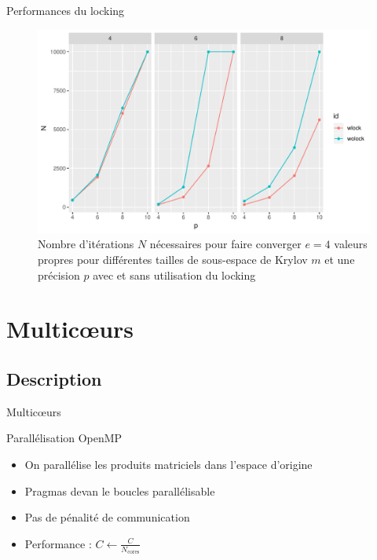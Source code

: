 \documentclass[9.5pt]{beamer}
\begin{document}
		\begin{frame}{Performances du locking}
			\begin{figure}
				\centering
				\includegraphics[width=0.8\linewidth, keepaspectratio]{../rapport/plots/Nvsp_complock.pdf}
				\caption{Nombre d'itérations $N$ nécessaires pour faire converger $e = 4$ valeurs propres pour différentes tailles de sous-espace de Krylov $m$ et une précision $p$ avec et sans utilisation du locking \label{fig:Nvsp_complock}}
			\end{figure}
		\end{frame}

\section{Multic\oe{}urs}
		\subsection{Description}
		\begin{frame}{Multic\oe{}urs}
			\begin{block}{Parallélisation OpenMP}
				\begin{itemize}
					\item On parallélise les produits matriciels dans l'espace d'origine
					\item Pragmas devan le boucles parallélisable
					\item Pas de pénalité de communication
					\item Performance : $C \leftarrow \frac{C}{N_\text{cores}}$
				\end{itemize}
			\end{block}
		\end{frame}
\end{document}
